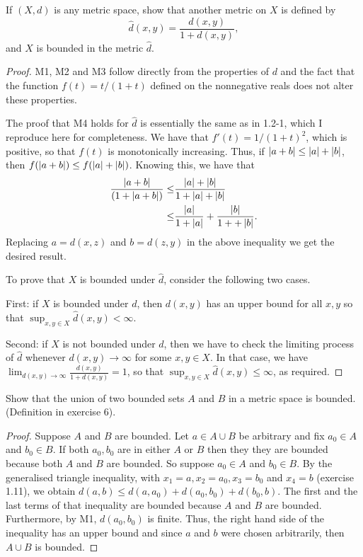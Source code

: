 \begin{exercise}{11}
If $(X,d)$ is any metric space, show that another metric on $X$ is defined by
\[
\hat{d}(x,y)=\frac{d(x,y)}{1+d(x,y)},
\]
and $X$ is bounded in the metric $\hat{d}$.
\end{exercise}
\begin{proof}
M1, M2 and M3 follow directly from the properties of $d$ and the fact that the function $f(t)=t/(1+t)$ defined on the nonnegative reals does not alter these properties.

The proof that M4 holds for $\hat{d}$ is essentially the same as in 1.2-1, which I reproduce here for completeness. We have that $f'(t)=1/(1+t)^2$, which is positive, so that $f(t)$ is monotonically increasing. Thus, if $\left\lvert a+b\right\rvert\leq \left\lvert a\right\rvert+\left\lvert b\right\rvert$, then $f(\left\lvert a+b\right\rvert)\leq f(\left\lvert a\right\rvert+\left\lvert b\right\rvert)$. Knowing this, we have that 
\begin{align*}
    \frac{\left\lvert a+b\right\rvert}{(1+\left\lvert a+b\right\rvert)} \leq& \frac{\left\lvert a\right\rvert+\left\lvert b\right\rvert}{1+\left\lvert a\right\rvert+\left\lvert b\right\rvert}\\
    \leq& \frac{\left\lvert a\right\rvert}{1+\left\lvert a\right\rvert} 
    + \frac{\left\lvert b\right\rvert}{1++\left\lvert b\right\rvert}.
\end{align*}
Replacing $a=d(x,z)$ and $b=d(z,y)$ in the above inequality we get the desired result.

To prove that $X$ is bounded under $\hat{d}$, consider the following two cases.

First: if $X$ is bounded under $d$, then $d(x,y)$ has an upper bound for all $x,y$ so that $\sup_{x,y\in X}\hat{d}(x,y)<\infty$.

Second: if $X$ is not bounded under $d$, then we have to check the limiting process of $\hat{d}$ whenever $d(x,y)\to\infty$ for some $x,y\in X$. In that case, we have $\lim_{d(x,y)\to\infty}\frac{d(x,y)}{1+d(x,y)}=1$, so that $\sup_{x,y\in X}\hat{d}(x,y)\leq \infty$, as required.
\end{proof}

\begin{exercise}{12}
Show that the union of two bounded sets $A$ and $B$ in a metric space is bounded. (Definition in exercise 6).
\end{exercise}
\begin{proof}
Suppose $A$ and $B$ are bounded. Let $a\in A\cup B$ be arbitrary and fix $a_0\in A$ and $b_0\in B$. If both $a_0,b_0$ are in either $A$ or $B$ then they they are bounded because both $A$ and $B$ are bounded. So suppose $a_0\in A$ and $b_0\in B$. By the generalised triangle inequality, with $x_1=a, x_2=a_0, x_3=b_0$ and $x_4=b$ (exercise 1.11), we obtain $d(a,b)\leq d(a,a_0)+d(a_0,b_0)+d(b_0,b)$. The first and the last terms of that inequality are bounded because $A$ and $B$ are bounded. Furthermore, by M1, $d(a_0,b_0)$ is finite. Thus, the right hand side of the inequality has an upper bound and since $a$ and $b$ were chosen arbitrarily, then $A\cup B$ is bounded.
\end{proof}


